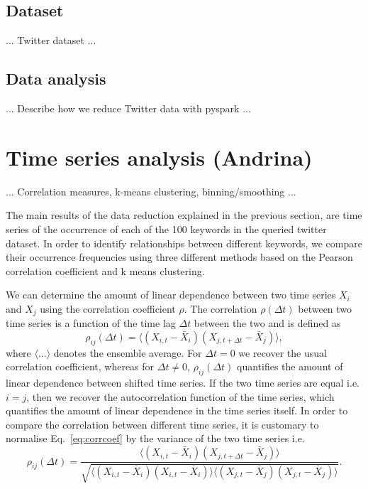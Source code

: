 \documentclass[12pt, a4paper]{article}
\begin{document}
\subsection{Dataset}
... Twitter dataset ...

\subsection{Data analysis}
... Describe how we reduce Twitter data with pyspark ...


\section{Time series analysis (Andrina)}
... Correlation measures, k-means clustering, binning/smoothing ...

The main results of the data reduction explained in the previous section, are time series of the occurrence of each of the 100 keywords in the queried twitter dataset. In order to identify relationships between different keywords, we compare their occurrence frequencies using three different methods based on the Pearson correlation coefficient and k means clustering. 

We can determine the amount of linear dependence between two time series $X_{i}$ and $X_{j}$ using the correlation coefficient $\rho$. The correlation $\rho(\Delta t)$ between two time series is a function of the time lag $\Delta t$ between the two and is defined as \cite{dettling14}
\begin{equation}
\rho_{ij}(\Delta t) = \langle (X_{i, t}-\bar{X}_{i}) (X_{j, t+\Delta t}-\bar{X}_{j}) \rangle, \label{eq:corrcoef}
\end{equation} 
where $\langle ... \rangle$ denotes the ensemble average. For $\Delta t = 0$ we recover the usual correlation coefficient, whereas for $\Delta t \neq 0$, $\rho_{ij}(\Delta t)$ quantifies the amount of linear dependence between shifted time series. If the two time series are equal i.e. $i = j$, then we recover the autocorrelation function of the time series, which quantifies the amount of linear dependence in the time series itself. In order to compare the correlation between different time series, it is customary to normalise Eq.~\ref{eq:corrcoef} by the variance of the two time series i.e. \cite{dettling14}
\begin{equation}
\rho_{ij}(\Delta t) = \frac{\langle (X_{i, t}-\bar{X}_{i}) (X_{j, t+\Delta t}-\bar{X}_{j}) \rangle}{\sqrt{\langle (X_{i, t}-\bar{X}_{i}) (X_{i, t}-\bar{X}_{i}) \rangle \langle (X_{j, t}-\bar{X}_{j}) (X_{j, t}-\bar{X}_{j}) \rangle}}. \label{eq:corrcoef1}
\end{equation} 
\end{document}
